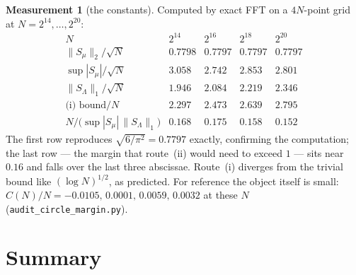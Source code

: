 \documentclass[11pt,a4paper]{article}
\theoremstyle{plain}
\theoremstyle{definition}
\newtheorem{measurement}[theorem]{Measurement}
\theoremstyle{remark}
\begin{document}
\begin{measurement}[the constants]\label{meas:circle}
Computed by exact FFT on a $4N$-point grid at
$N=2^{14},\dots,2^{20}$:
\[
\begin{array}{r|cccc}
 N & 2^{14} & 2^{16} & 2^{18} & 2^{20}\\\hline
 \|S_\mu\|_2/\sqrt N & 0.7798 & 0.7797 & 0.7797 & 0.7797\\
 \sup|S_\mu|/\sqrt N & 3.058 & 2.742 & 2.853 & 2.801\\
 \|S_\Lambda\|_1/\sqrt N & 1.946 & 2.084 & 2.219 & 2.346\\
 \text{(i) bound}/N & 2.297 & 2.473 & 2.639 & 2.795\\
 N/\bigl(\sup|S_\mu|\,\|S_\Lambda\|_1\bigr) & 0.168 & 0.175 & 0.158
  & 0.152
\end{array}
\]
The first row reproduces $\sqrt{6/\pi^2}=0.7797$ exactly, confirming
the computation; the last row --- the margin that route~(ii) would
need to exceed $1$ --- sits near $0.16$ and falls over the last three
abscissae. Route~(i) diverges from the trivial bound like
$(\log N)^{1/2}$, as predicted. For reference the object itself is
small: $C(N)/N=-0.0105,\,0.0001,\,0.0059,\,0.0032$ at these $N$
(\texttt{audit\_circle\_margin.py}).
\end{measurement}

\section{Summary}
\end{document}
